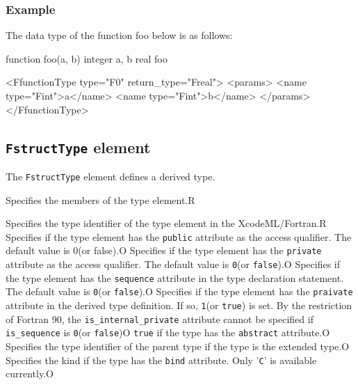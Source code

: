 \subsubsection*{Example}

The data type of the function foo below is as follows:
\vspace{2mm}

\begin{Fexample90}
function foo(a, b)
  integer a, b
  real foo
\end{Fexample90}
\vspace{1mm}

\begin{XcodeMLFExample}
<FfunctionType type="F0" return_type="Freal">
  <params>
    <name type="Fint">a</name>
    <name type="Fint">b</name>
  </params>
</FfunctionType>
\end{XcodeMLFExample}


\subsection{ {\tt FstructType} element}

The {\tt FstructType} element defines a derived type.


\begin{XcodeMLChildElements}
{Specifies the members of the type element.}{R}
\end{XcodeMLChildElements}

\begin{XcodeMLAttributes}
{Specifies the type identifier of the type element in the XcodeML/Fortran.}{R}
{Specifies if the type element has the {\tt public} attribute as the access qualifier.
The default value is 0(or false).}{O}
{Specifies if the type element has the {\tt private} attribute as the access qualifier.
The default value is {\tt 0}(or {\tt false}).}{O}
{Specifies if the type element has the {\tt sequence} attribute in the type declaration statement.
The default value is {\tt 0}(or {\tt false}).}{O}
{Specifies if the type element has the {\tt praivate} attribute in the derived type definition. If so, {\tt 1}(or {\tt true}) is set.
By the restriction of Fortran 90, the {\tt is\_internal\_private} attribute cannot be specified if {\tt is\_sequence} is {\tt 0}(or {\tt false})}{O}
{{\tt true} if the type has the {\tt abstract} attribute.}{O}
{Specifies the type identifier of the parent type if the type is the extended type.}{O}
{Specifies the kind if the type has the {\tt bind} attribute. Only '{\tt C}' is available currently.}{O}
\end{XcodeMLAttributes}


